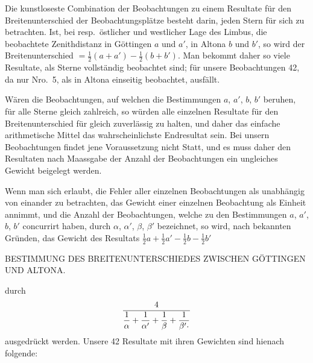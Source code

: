 Die kunstloseste Combination der Beobachtungen zu einem Resultate für
den Breitenunterschied der Beobachtungsplätze besteht darin, jeden Stern für
sich zu betrachten. Ist, bei resp.\ östlicher und westlicher Lage des Limbus,
die beobachtete Zenithdistanz in Göttingen $a$ und $a'$, in Altona $b$ und $b'$, so
wird der Breitenunterschied $=\frac12(a+a')-\frac12(b+b')$. Man bekommt daher so
viele Resultate, als Sterne vollständig beobachtet sind; für unsere Beobachtungen
42, da nur Nro.\ 5, als in Altona einseitig beobachtet, ausfällt.

Wären die Beobachtungen, auf welchen die Bestimmungen $a$, $a'$, $b$, $b'$ beruhen,
für alle Sterne gleich zahlreich, so würden alle einzelnen Resultate
für den Breitenunterschied für gleich zuverlässig zu halten, und daher das
einfache arithmetische Mittel das wahrscheinlichste Endresultat sein. Bei
unsern Beobachtungen findet jene Voraussetzung nicht Statt, und es muss
daher den Resultaten nach Maassgabe der Anzahl der Beobachtungen ein ungleiches
Gewicht beigelegt werden.

Wenn man sich erlaubt, die Fehler aller einzelnen Beobachtungen als
unabhängig von einander zu betrachten, das Gewicht einer einzelnen Beobachtung
als Einheit annimmt, und die Anzahl der Beobachtungen, welche zu
den Bestimmungen $a$, $a'$, $b$, $b'$ concurrirt haben, durch $\alpha$, $\alpha'$, $\beta$, $\beta'$ bezeichnet, so
wird, nach bekannten Gründen, das Gewicht des Resultats $\frac12a+\frac12a'-\frac12b-\frac12b'$

\clearpage
\noindent{}\parbox[t]{\dimexpr\textwidth-10mm\relax}{\centering\scriptsize BESTIMMUNG DES BREITENUNTERSCHIEDES ZWISCHEN GÖTTINGEN UND ALTONA.}\par

\noindent durch
\[
\frac{4}{\dfrac1\alpha+\dfrac1{\alpha'}+\dfrac1\beta+\dfrac1{\beta'\mathord{\text{\raisebox{.3ex}{.}}}}}
\]
ausgedrückt werden. Unsere 42 Resultate mit ihren Gewichten sind hienach
folgende:

